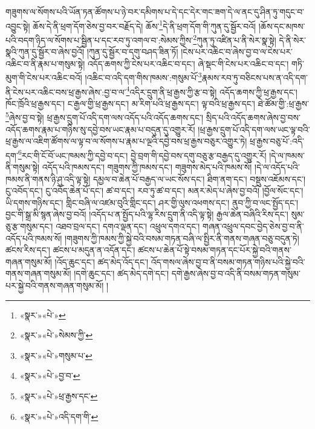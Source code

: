 གཟུགས་ལ་སོགས་པའི་ཡོན་ཏན་ཚོགས་པ་ཉེ་བར་དམིགས་པ་དེ་དང་དེར་གང་ཟག་དེ་ལ་ནང་དུ་ཤིན་ཏུ་གདུང་བ་འབྱུང་སྟེ། ཆོས་དེ་ནི་ཕྲག་དོག་ཅེས་བྱ་བར་བརྗོད་དེ། ཆོས་\footnote{«སྣར་»«པེ་»}དེ་ནི་ཕྲག་དོག་གི་ཀུན་དུ་སྦྱོར་བའོ། །ཆོས་དང་མཁས་པའི་བདག་ཉིད་ལ་སོགས་པ་སྦྱིན་པ་དང་རབ་ཏུ་འགལ་བ་:སེམས་ཀྱིས་\footnote{«སྣར་»«པེ་»སེམས་ཀྱི་}ཀུན་ཏུ་འཛིན་པ་ནི་སེར་སྣ་སྟེ། དེ་ནི་སེར་སྣའི་ཀུན་དུ་སྦྱོར་བ་ཞེས་བྱའོ། །ཀུན་དུ་སྦྱོར་བ་དགུ་བཤད་ཟིན་ཏོ། །ངེས་པར་འཆིང་བ་ཞེས་བྱ་བ་ལ་ངེས་པར་འཆིང་བ་ནི་རྣམ་པ་གསུམ་སྟེ། འདོད་ཆགས་ཀྱི་ངེས་པར་འཆིང་བ་དང་། ཞེ་སྡང་གི་ངེས་པར་འཆིང་བ་དང་། གཏི་མུག་གི་ངེས་པར་འཆིང་བའོ། །འཆིང་བ་འདི་དག་གིས་ཁམས་:གསུམ་པོ་\footnote{«སྣར་»«པེ་»གསུམ་པ་}རྣམས་རབ་ཏུ་བཅིངས་པས་ན་འདི་དག་ནི་ངེས་པར་འཆིང་བས་ཕྲ་རྒྱས་ཞེས་:བྱ་བ་ལ་\footnote{«སྣར་»«པེ་»བྱ་བ་}འདིར་དྲུག་ནི་ཕྲ་རྒྱས་ཀྱི་རྩ་བ་སྟེ། འདོད་ཆགས་ཀྱི་ཕྲ་རྒྱས་དང་། ཁོང་ཁྲོའི་ཕྲ་རྒྱས་དང་། ང་རྒྱལ་གྱི་ཕྲ་རྒྱས་དང་། མ་རིག་པའི་ཕྲ་རྒྱས་དང་། ལྟ་བའི་ཕྲ་རྒྱས་དང་། ཐེ་ཚོམ་གྱི་:ཕྲ་རྒྱས་\footnote{«སྣར་»«པེ་»ཕྲ་རྒྱས་དང་}ཞེས་བྱ་བ་སྟེ། ཕྲ་རྒྱས་དྲུག་པོ་འདི་དག་ལས་འདོད་པའི་འདོད་ཆགས་དང་། སྲིད་པའི་འདོད་ཆགས་ཞེས་བྱ་བས་འདོད་ཆགས་རྣམ་པ་གཉིས་སུ་དབྱེ་བས་ཡང་རྣམ་པ་བདུན་དུ་འགྱུར་རོ། །ཕྲ་རྒྱས་དྲུག་པོ་འདི་དག་ལས་ཡང་ལྟ་བའི་ཕྲ་རྒྱས་ལ་འཇིག་ཚོགས་ལ་ལྟ་བ་ལ་སོགས་པ་རྣམ་པ་ལྔའི་དབྱེ་བས་ཕྲ་རྒྱས་བཅུར་འགྱུར་ཏེ། ཕྲ་རྒྱས་བཅུ་པོ་:འདི་དག་\footnote{«སྣར་»«པེ་»འདི་དག་གི་}རང་གི་ངོ་བོ་ཡང་ཁམས་ཀྱི་དབྱེ་བ་དང་། བྱེ་བྲག་གི་དབྱེ་བས་དགུ་བཅུ་རྩ་བརྒྱད་དུ་འགྱུར་རོ། །དེ་ལ་ཁམས་ནི་གསུམ་སྟེ། འདོད་པའི་ཁམས་དང་། གཟུགས་ཀྱི་ཁམས་དང་། གཟུགས་མེད་པའི་ཁམས་སོ། །དེ་ལ་འདོད་པའི་ཁམས་ནི་གནས་ཉི་ཤུ་འདི་ལྟ་སྟེ། དམྱལ་བ་ཆེན་པོ་བརྒྱད་ལ་ཡང་སོས་དང་། ཐིག་ནག་དང་། བསྡུས་འཇོམས་དང་། ངུ་འབོད་དང་། ངུ་འབོད་ཆེན་པོ་དང་། ཚ་བ་དང་། རབ་ཏུ་ཚ་བ་དང་། མནར་མེད་པ་ཞེས་བྱ་བའོ། །བྱོལ་སོང་དང་། ཡི་དགས་གཉིས་དང་། གླིང་བཞི་ལ་འཛམ་བུའི་གླིང་དང་། ཤར་གྱི་ལུས་འཕགས་དང་། ནུབ་ཀྱི་བ་ལང་སྤྱོད་དང་། བྱང་གི་སྒྲ་མི་སྙན་ཞེས་བྱ་བའོ། །འདོད་པ་ན་སྤྱོད་པའི་ལྷ་རིས་དྲུག་ནི་འདི་ལྟ་སྟེ། རྒྱལ་ཆེན་བཞིའི་རིས་དང་། སུམ་ཅུ་རྩ་གསུམ་དང་། འཐབ་བྲལ་དང་། དགའ་ལྡན་དང་། འཕྲུལ་དགའ་དང་། གཞན་འཕྲུལ་དབང་བྱེད་ཅེས་བྱ་བ་ནི་འདོད་པའི་ཁམས་སོ། །གཟུགས་ཀྱི་ཁམས་ཀྱི་སྐྱེ་བའི་བསམ་གཏན་བཞི་ལ་སྤྱིར་ནི་གནས་གཞན་བཅུ་བདུན་ཏེ། ཚངས་རིས་དང་། ཚངས་པ་མདུན་ན་འདོན་དང་། ཚངས་པ་ཆེན་པོ་སྟེ་བསམ་གཏན་དང་པོར་སྐྱེ་བའི་གནས་གཞན་གསུམ་མོ། །འོད་ཆུང་དང་། ཚད་མེད་འོད་དང་། འོད་གསལ་ཞེས་བྱ་བ་ནི་བསམ་གཏན་གཉིས་པའི་སྐྱེ་བའི་གནས་གཞན་གསུམ་མོ། །དགེ་ཆུང་དང་། ཚད་མེད་དགེ་དང་། དགེ་རྒྱས་ཞེས་བྱ་བ་འདི་ནི་བསམ་གཏན་གསུམ་པར་སྐྱེ་བའི་གནས་གཞན་གསུམ་མོ། །
